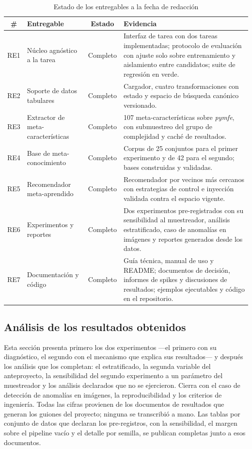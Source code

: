\documentclass[12pt,letterpaper,oneside]{article}
\begin{document}
\begin{table}[H]
\centering
\small
\caption{Estado de los entregables a la fecha de redacción}
\label{tab:estado-entregables}
\begin{tabularx}{\textwidth}{>{}C>{}L>{}C>{}L}
\toprule
\textbf{\#} & \textbf{Entregable} & \textbf{Estado} & \textbf{Evidencia} \\
\midrule
RE1 & Núcleo agnóstico a la tarea & Completo &
Interfaz de tarea con dos tareas implementadas; protocolo de evaluación con ajuste solo
sobre entrenamiento y aislamiento entre candidatos; suite de regresión en verde. \\
\addlinespace
RE2 & Soporte de datos tabulares & Completo &
Cargador, cuatro transformaciones con estado y espacio de búsqueda canónico versionado. \\
\addlinespace
RE3 & Extractor de meta-características & Completo &
107 meta-características sobre \textit{pymfe}, con submuestreo del grupo de complejidad y
caché de resultados. \\
\addlinespace
RE4 & Base de meta-conocimiento & Completo &
Corpus de 25 conjuntos para el primer experimento y de 42 para el segundo; bases construidas
y validadas. \\
\addlinespace
RE5 & Recomendador meta-aprendido & Completo &
Recomendador por vecinos más cercanos con estrategias de control e inyección validada contra
el espacio vigente. \\
\addlinespace
RE6 & Experimentos y reportes & Completo &
Dos experimentos pre-registrados con su sensibilidad al muestreador, análisis estratificado,
caso de anomalías en imágenes y reportes generados desde los datos. \\
\addlinespace
RE7 & Documentación y código & Completo &
Guía técnica, manual de uso y README; documentos de decisión, informes de spikes y
discusiones de resultados; ejemplos ejecutables y código en el repositorio. \\
\bottomrule
\end{tabularx}
\end{table}

\subsection{Análisis de los resultados obtenidos}

Esta sección presenta primero los dos experimentos ---el primero con su diagnóstico, el
segundo con el mecanismo que explica sus resultados--- y después los análisis que los
completan: el estratificado, la segunda variable del anteproyecto, la sensibilidad del
segundo experimento a un parámetro del muestreador y los análisis declarados que no se
ejercieron. Cierra con el caso de detección de anomalías en imágenes, la reproducibilidad y
los criterios de ingeniería. Todas las cifras provienen de los documentos de resultados que
generan los guiones del proyecto; ninguna se transcribió a mano. Las tablas por conjunto de
datos que declaran los pre-registros, con la sensibilidad, el margen sobre el pipeline vacío
y el detalle por semilla, se publican completas junto a esos documentos.
\end{document}
